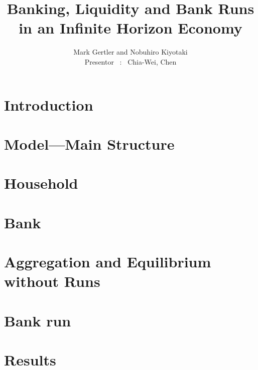 \documentclass[mathserif]{beamer}
\title{Banking, Liquidity and Bank Runs in an Infinite Horizon Economy}
\author{Mark Gertler and Nobuhiro Kiyotaki \\ 
\small Presentor ~:~ Chia-Wei, Chen}
\begin{document}
    \begin{frame}
        
        \maketitle
    \end{frame}

    \section{Introduction}
    

    \section{Model---Main Structure}
    

    \section{Household}
    

    \section{Bank}
    

    \section{Aggregation and Equilibrium without Runs}
    

    \section{Bank run}
    

    \section{Results}
    
\end{document}

